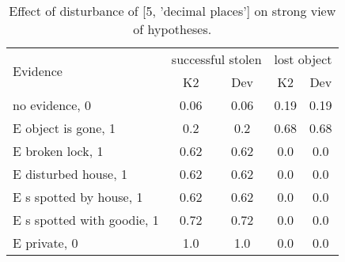 \begin{table}\begin{tabular}{l|cc|cc}\toprule\multirow{2}{*}{Evidence} & \multicolumn{2}{c}{successful stolen}& \multicolumn{2}{c}{lost object}\\& {K2} & {Dev}& {K2} & {Dev}\\\midrule
no evidence, 0 & 0.06&0.06&0.19&0.19\\E object is gone, 1 & 0.2&0.2&0.68&0.68\\E broken lock, 1 & 0.62&0.62&0.0&0.0\\E disturbed house, 1 & 0.62&0.62&0.0&0.0\\E s spotted by house, 1 & 0.62&0.62&0.0&0.0\\E s spotted with goodie, 1 & 0.72&0.72&0.0&0.0\\E private, 0 & 1.0&1.0&0.0&0.0\\\bottomrule\end{tabular}\caption{Effect of disturbance of [5, 'decimal places'] on strong view of hypotheses.}\end{table}